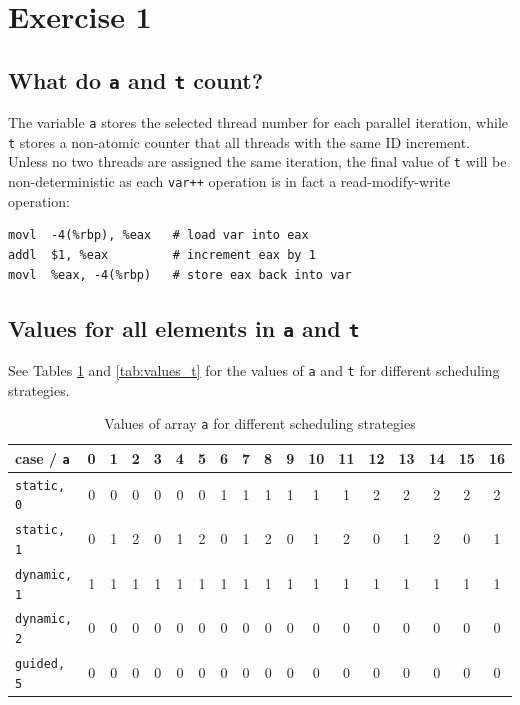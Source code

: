 \documentclass[a4paper,%
7pt,%
DIV12,
headsepline,%
headings=normal,
]{scrartcl}
\begin{document}
\maketitlepage




\section{Exercise 1}



\subsection{What do \texttt{a} and \texttt{t} count?}

The variable \texttt{a} stores the selected thread number for each parallel iteration, while \texttt{t} stores a non-atomic counter that all threads with the same ID increment. Unless no two threads are assigned the same iteration, the final value of \texttt{t} will be non-deterministic as each \texttt{var++} operation is in fact a read-modify-write operation:

\begin{lstlisting}
movl  -4(%rbp), %eax   # load var into eax
addl  $1, %eax         # increment eax by 1
movl  %eax, -4(%rbp)   # store eax back into var
\end{lstlisting}

\subsection{Values for all elements in \texttt{a} and \texttt{t}}

See Tables \ref{tab:values_a} and \ref{tab:values_t} for the values of \texttt{a} and \texttt{t} for different scheduling strategies.

\begin{table}[htbp]
    \centering
    \caption{Values of array \texttt{a} for different scheduling strategies}
    \label{tab:values_a}
    \begin{tabular}{l*{17}{c}}
        \toprule
        case / \texttt{a} & 0 & 1 & 2 & 3 & 4 & 5 & 6 & 7 & 8 & 9 & 10 & 11 & 12 & 13 & 14 & 15 & 16 \\
        \midrule
        \texttt{static, 0} & 0 & 0 & 0 & 0 & 0 & 0 & 1 & 1 & 1 & 1 & 1 & 1 & 2 & 2 & 2 & 2 & 2 \\
        \texttt{static, 1} & 0 & 1 & 2 & 0 & 1 & 2 & 0 & 1 & 2 & 0 & 1 & 2 & 0 & 1 & 2 & 0 & 1 \\
        \texttt{dynamic, 1} & 1 & 1 & 1 & 1 & 1 & 1 & 1 & 1 & 1 & 1 & 1 & 1 & 1 & 1 & 1 & 1 & 1 \\
        \texttt{dynamic, 2} & 0 & 0 & 0 & 0 & 0 & 0 & 0 & 0 & 0 & 0 & 0 & 0 & 0 & 0 & 0 & 0 & 0 \\
        \texttt{guided, 5} & 0 & 0 & 0 & 0 & 0 & 0 & 0 & 0 & 0 & 0 & 0 & 0 & 0 & 0 & 0 & 0 & 0 \\
        \bottomrule
    \end{tabular}
\end{table}
\end{document}
